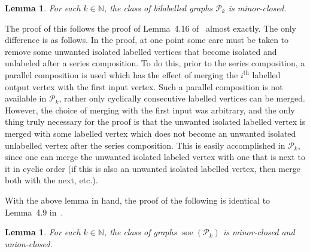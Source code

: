 \documentclass[a4paper,onecolumn,11pt,accepted=2026-01-06]{quantumarticle}
\theoremstyle{plain}
\newtheorem{lem}[thm]{Lemma}
\theoremstyle{remark}
\theoremstyle{definition}
\DeclareMathOperator{\soe}{soe}
\def\calP{{\mathcal P}} \def\calQ{{\mathcal Q}} \def\calR{{\mathcal R}}
\begin{document}
\begin{lem}\label{lem:minor-closedbl}
    For each $k \in \mathbb{N}$, the class of bilabelled graphs $\calP_k$ is minor-closed. 
\end{lem}
The proof of this follows the proof of Lemma~4.16 of~\cite{roberson-seppelt-arxiv} almost exactly. The only difference is as follows. In the proof, at one point some care must be taken to remove some unwanted isolated labelled vertices that become isolated and unlabeled after a series composition. To do this, prior to the series composition, a parallel composition is used which has the effect of merging the $i^\text{th}$ labelled output vertex with the first input vertex. Such a parallel composition is not available in $\calP_k$, rather only cyclically consecutive labelled vertices can be merged. However, the choice of merging with the first input was arbitrary, and the only thing truly necessary for the proof is that the unwanted isolated labelled vertex is merged with some labelled vertex which does not become an unwanted isolated unlabelled vertex after the series composition. This is easily accomplished in $\calP_k$, since one can merge the unwanted isolated labeled vertex with one that is next to it in cyclic order (if this is also an unwanted isolated labelled vertex, then merge both with the next, etc.).

With the above lemma in hand, the proof of the following is identical to Lemma~4.9 in~\cite{roberson-seppelt-arxiv}.

\begin{lem}\label{lem:minor-closed}
    For each $k \in \mathbb{N}$, the class of graphs $\soe(\calP_k)$ is minor-closed and union-closed. 
\end{lem}



\end{document}
